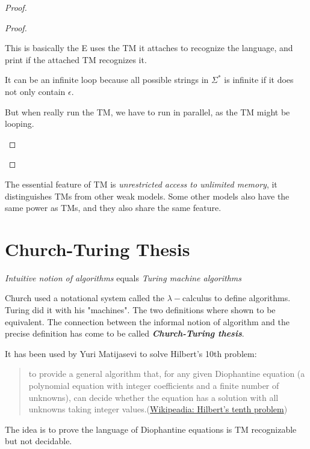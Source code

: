 \begin{proof}
\begin{proof}
        \begin{intuition}
            This is basically the E uses the TM it attaches to recognize the language, and print if the attached TM recognizes it.

            It can be an infinite loop because all possible strings in \(\Sigma^*\) is infinite if it does not only contain \(\epsilon\).  

            But when really run the TM, we have to run in parallel, as the TM might be looping.
        \end{intuition}
    \end{proof}
\end{proof}

The essential feature of TM is \textit{unrestricted access to unlimited memory}, it distinguishes TMs from other weak models. Some other models also have the same power as TMs, and they also share the same feature.

\section{Church-Turing Thesis}

\begin{remark}
    \textit{Intuitive notion of algorithms}    
    \quad 
    equals 
    \quad 
    \textit{Turing machine algorithms}
\end{remark}

Church used a notational system called the \(\lambda-\)calculus to define algorithms. Turing did it with his "machines". The two definitions where shown to be equivalent. The connection between the informal notion of algorithm and the precise definition has come to be called \textit{\textbf{Church-Turing thesis}}.

It has been used by Yuri Matijasevi to solve Hilbert's 10th problem:

\begin{quotation}
    to provide a general algorithm that, for any given Diophantine equation (a polynomial equation with integer coefficients and a finite number of unknowns), can decide whether the equation has a solution with all unknowns taking integer values.(\href{https://en.wikipedia.org/wiki/Hilbert%27s_tenth_problem}{Wikipeadia: Hilbert's tenth problem}) 
\end{quotation}

\begin{note}
    The idea is to prove the language of Diophantine equations is TM recognizable but not decidable.
\end{note}

